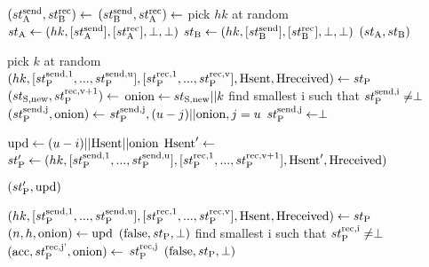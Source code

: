 \algrenewcommand\textproc{}
\algrenewcommand{}

\begin{minipage}{\linewidth}
  {\fontsize{10}{12}\selectfont
  \begin{algorithmic}[1]
    \State $(st_\text{A}^\text{send},st_\text{B}^\text{rec}) \gets$ 
    \State $(st_\text{B}^\text{send},st_\text{A}^\text{rec}) \gets$ 
    \State pick $hk$ at random
    \State $st_\text{A} \gets (hk, [st_\text{A}^\text{send}], [st_\text{A}^\text{rec}],\perp,\perp)$ 
    \State $st_\text{B} \gets (hk, [st_\text{B}^\text{send}], [st_\text{B}^\text{rec}],\perp,\perp)$ 
    \State \Return $(st_\text{A},st_\text{B})$
    \EndProcedure
    
    \item[]
    
    \State pick $k$ at random
    \State $(hk, [st_\text{P}^\text{send,1},...,st_\text{P}^\text{send,u}],
                 [st_\text{P}^\text{rec,1},...,st_\text{P}^\text{rec,v}],
    \text{Hsent}, \text{Hreceived}) \gets st_\text{P}$
    \State $(st_\text{S,new},st_\text{P}^\text{rec,v+1}) \gets$ 
    \State $\text{onion} \gets st_\text{S,new} || k$
    \State find smallest i such that $st_\text{P}^\text{send,i} \neq \perp$
    \State $(st_\text{P}^\text{send,j},\text{onion}) \gets$ 
               {$st_\text{P}^\text{send,j},(u-j)||\text{onion},j=u$}
    \State $st_\text{P}^\text{send,j} \gets \perp$
    \EndIf
    \EndFor

    \State $\text{upd} \gets (u-i)||\text{Hsent}||\text{onion}$
    \State $\text{Hsent}' \gets$ 
    \State $st_\text{P}' \gets (hk,[st_\text{P}^\text{send,1},...,st_\text{P}^\text{send,u}],
                 [st_\text{P}^\text{rec,1},...,st_\text{P}^\text{rec,v+1}], \text{Hsent}', \text{Hreceived})$

    \State \Return $(st_\text{P}', \text{upd})$
    \EndProcedure
    
    \item[] %
    
    \State $(hk, [st_\text{P}^\text{send,1},...,st_\text{P}^\text{send,u}],
                 [st_\text{P}^\text{rec,1},...,st_\text{P}^\text{rec,v}],
    \text{Hsent}, \text{Hreceived}) \gets st_\text{P}$
    \State $(n,h,\text{onion}) \gets \text{upd}$
    \State \Return $(\text{false},st_\text{P},\perp)$
    \EndIf
    \State find smallest i such that $st_\text{P}^\text{rec,i} \neq \perp$
    \State $(\text{acc},st_\text{P}^\text{rec,j'},\text{onion}) \gets$ 
    {$st_\text{P}^\text{rec,j}$}
    \State \Return $(\text{false},st_\text{P},\perp)$
    \EndIf
    \EndFor


\end{algorithmic}}
\end{minipage}
